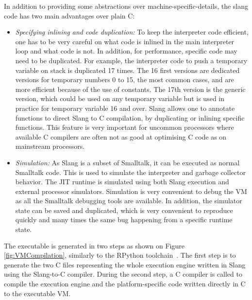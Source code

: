 \documentclass[a4paper,12pt,twoside]{../includes/ThesisStyle}
\begin{document}
In addition to providing some abstractions over machine-specific-details, the slang code has two main advantages over plain C:
\begin{itemize}
	\item \emph{Specifying inlining and code duplication:} To keep the interpreter code efficient, one has to be very careful on what code is inlined in the main interpreter loop and what code is not. In addition, for performance, specific code may need to be duplicated. For example, the interpreter code to push a temporary variable on stack is duplicated 17 times. The 16 first versions are dedicated versions for temporary numbers 0 to 15, the most common cases, and are more efficient because of the use of constants. The 17th version is the generic version, which could be used on any temporary variable but is used in practice for temporary variable 16 and over. Slang allows one to annotate functions to direct Slang to C compilation, by duplicating or inlining specific functions. This feature is very important for uncommon processors where available C compilers are often not as good at optimising C code as on mainstream processors.
	\item \emph{Simulation:} As Slang is a subset of Smalltalk, it can be executed as normal Smalltalk code. This is used to simulate the interpreter and garbage collector behavior. The JIT runtime is simulated using both Slang execution and external processor simulators. Simulation is very convenient to debug the VM as all the Smalltalk debugging tools are available. In addition, the simulator state can be saved and duplicated, which is very convenient to reproduce quickly and many times the same bug happening from a specific runtime state.
\end{itemize}

The executable is generated in two steps as shown on Figure \ref{fig:VMCompilation}, similarly to the RPython toolchain~\cite{Rigo06a}. The first step is to generate the two C files representing the whole execution engine written in Slang using the Slang-to-C compiler. During the second step, a C compiler is called to compile the execution engine and the platform-specific code written directly in C to the executable VM.
\end{document}
